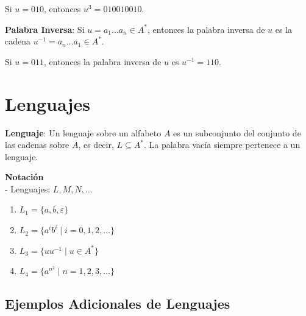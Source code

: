 \documentclass[12pt]{report} %
\begin{document}
\begin{ejemplo}
Si $u = 010$, entonces $u^3 = 010010010$.
\end{ejemplo}

\begin{definicion}
\textbf{Palabra Inversa}: Si $u = a_1 \ldots a_n \in A^*$, entonces la palabra inversa de $u$ es la cadena $u^{-1} = a_n \ldots a_1 \in A^*$.  
\end{definicion}

\begin{ejemplo}
Si $u = 011$, entonces la palabra inversa de $u$ es $u^{-1} = 110$.
\end{ejemplo}

\hypertarget{lenguajes}{%
\section{Lenguajes}\label{lenguajes}}

\begin{definicion}
\textbf{Lenguaje}: Un lenguaje sobre un alfabeto $A$ es un subconjunto del conjunto de las cadenas sobre $A$, es decir, $L \subseteq A^*$.  
La palabra vacía siempre pertenece a un lenguaje.
\end{definicion}

\textbf{Notación}\\
- Lenguajes: \(L, M, N, \ldots\)

\begin{ejemplo}
    \begin{enumerate}
        \item $L_1 = \{a, b, \varepsilon\}$  
        \item $L_2 = \{a^i b^i \mid i = 0, 1, 2, \ldots\}$  
        \item $L_3 = \{u u^{-1} \mid u \in A^*\}$  
        \item $L_4 = \{a^{n^2} \mid n = 1, 2, 3, \ldots\}$  
    \end{enumerate}
\end{ejemplo}

\hypertarget{ejemplos-adicionales-de-lenguajes}{%
\subsection{Ejemplos Adicionales de
Lenguajes}\label{ejemplos-adicionales-de-lenguajes}}
\end{document}
